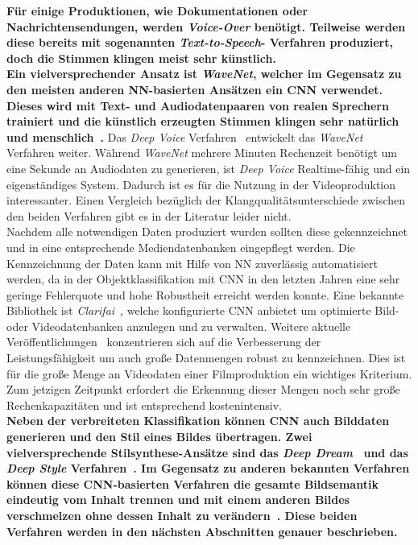 \documentclass[times, 11pt,twocolumn]{article}
\begin{document}
 \label{sec:SOTAPostproduktion}
\textbf{Für einige Produktionen, wie Dokumentationen oder Nachrichtensendungen, werden \textit{Voice-Over} benötigt.\textbf{ Teilweise werden diese bereits mit sogenannten \textit{Text-to-Speech}- Verfahren produziert, doch die Stimmen klingen meist sehr künstlich. }\\
Ein vielversprechender Ansatz ist \textit{WaveNet}, welcher im Gegensatz zu den meisten anderen NN-basierten Ansätzen ein CNN verwendet. Dieses wird mit Text- und Audiodatenpaaren von realen Sprechern trainiert und die künstlich erzeugten Stimmen klingen sehr natürlich und menschlich~\cite{OordDZSVGKSK16}.} Das \textit{Deep Voice} Verfahren~\cite{DeepVoice} entwickelt das \textit{WaveNet} Verfahren weiter. Während \textit{WaveNet} mehrere Minuten Rechenzeit benötigt um eine Sekunde an Audiodaten zu generieren, ist \textit{Deep Voice} Realtime-fähig und ein eigenständiges System. Dadurch ist es für die Nutzung in der Videoproduktion interessanter. Einen Vergleich bezüglich der Klangqualitätsunterschiede zwischen den beiden Verfahren gibt es in der Literatur leider nicht.
\\
Nachdem alle notwendigen Daten produziert wurden sollten diese gekennzeichnet und in eine entsprechende Mediendatenbanken eingepflegt werden. Die Kennzeichnung der Daten kann mit Hilfe von NN zuverlässig automatisiert werden, da in der Objektklassifikation mit CNN in den letzten Jahren eine sehr geringe Fehlerquote und hohe Robustheit erreicht werden konnte. Eine bekannte Bibliothek ist \textit{Clarifai}~\cite{MITReview}, welche konfigurierte CNN anbietet um optimierte Bild- oder Videodatenbanken anzulegen und zu verwalten.  Weitere aktuelle Veröffentlichungen~\cite{Ng_VideoLabelling}\cite{Ye:VideoLabelling}\cite{KangEABZ17} konzentrieren sich auf die Verbesserung der Leistungsfähigkeit um auch große Datenmengen robust zu kennzeichnen. Dies ist für die große Menge an Videodaten einer Filmproduktion ein wichtiges Kriterium. Zum jetzigen Zeitpunkt erfordert die Erkennung dieser Mengen noch sehr große Rechenkapazitäten und ist entsprechend kostenintensiv. \\

\textbf{Neben der verbreiteten Klassifikation können CNN auch Bilddaten generieren und den Stil eines Bildes übertragen. Zwei vielversprechende Stilsynthese-Ansätze sind das \textit{Deep Dream}~\cite{DeepDream} und das \textit{Deep Style} Verfahren~\cite{GatysEB15a}. Im Gegensatz zu anderen bekannten Verfahren können diese CNN-basierten Verfahren die gesamte Bildsemantik eindeutig vom Inhalt trennen und mit einem anderen Bildes verschmelzen ohne dessen Inhalt zu verändern~\cite{McCaigDG16}. Diese beiden Verfahren werden in den nächsten Abschnitten genauer beschrieben.}
\end{document}

